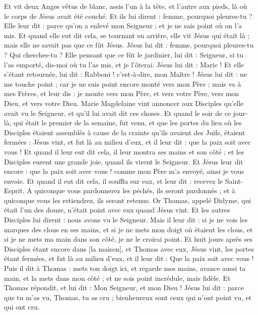\begin{multicols}{2}
Et vit deux Anges vêtus de blanc, assis l'un à la tête, et l'autre aux pieds, là où le corps de Jésus avait été couché.
Et ils lui dirent : femme, pourquoi pleures-tu ? Elle leur dit : parce qu'on a enlevé mon Seigneur ; et je ne sais point où on l'a mis.
Et quand elle eut dit cela, se tournant en arrière, elle vit Jésus qui était là ; mais elle ne savait pas que ce fût Jésus.
Jésus lui dit : femme, pourquoi pleures-tu ? Qui cherches-tu ? Elle pensant que ce fût le jardinier, lui dit : Seigneur, si tu l'as emporté, dis-moi où tu l'as mis, et je l'ôterai.
Jésus lui dit : Marie ! Et elle s'étant retournée, lui dit : Rabboni ! c'est-à-dire, mon Maître !
Jésus lui dit : ne me touche point ; car je ne suis point encore monté vers mon Père ; mais va à mes Frères, et leur dis : je monte vers mon Père, et vers votre Père, vers mon Dieu, et vers votre Dieu.
Marie Magdelaine vint annoncer aux Disciples qu'elle avait vu le Seigneur, et qu'il lui avait dit ces choses.
Et quand le soir de ce jour-là, qui était le premier de la semaine, fut venu, et que les portes du lieu où les Disciples étaient assemblés à cause de la crainte qu'ils avaient des Juifs, étaient fermées : Jésus vint, et fut là au milieu d'eux, et il leur dit : que la paix soit avec vous !
Et quand il leur eut dit cela, il leur montra ses mains et son côté ; et les Disciples eurent une grande joie, quand ils virent le Seigneur.
Et Jésus leur dit encore : que la paix soit avec vous ! comme mon Père m'a envoyé, ainsi je vous envoie.
Et quand il eut dit cela, il souffla sur eux, et leur dit : recevez le Saint-Esprit.
A quiconque vous pardonnerez les péchés, ils seront pardonnés ; et à quiconque vous les retiendrez, ils seront retenus.
Or Thomas, appelé Didyme, qui était l'un des douze, n'était point avec eux quand Jésus vint.
Et les autres Disciples lui dirent : nous avons vu le Seigneur. Mais il leur dit : si je ne vois les marques des clous en ses mains, et si je ne mets mon doigt où étaient les clous, et si je ne mets ma main dans son côté, je ne le croirai point.
Et huit jours après ses Disciples étant encore dans [la maison], et Thomas avec eux, Jésus vint, les portes étant fermées, et fut là au milieu d'eux, et il leur dit : Que la paix soit avec vous !
Puis il dit à Thomas : mets ton doigt ici, et regarde mes mains, avance aussi ta main, et la mets dans mon côté ; et ne sois point incrédule, mais fidèle.
Et Thomas répondit, et lui dit : Mon Seigneur, et mon Dieu !
Jésus lui dit : parce que tu m'as vu, Thomas, tu as cru ; bienheureux sont ceux qui n'ont point vu, et qui ont cru.

\end{multicols}
